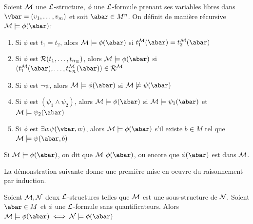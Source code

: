\begin{defi}
Soient $\mathcal{M}$ une $\mathcal{L}$-structure, $\phi$ une $\mathcal{L}$-formule prenant ses variables libres dans $ \vbar = (v_1,\dots,v_m)$
et soit $\abar \in M^n$. On définit de manière récursive $\cM \models \phi(\abar)$:
\begin{enumerate}
\item Si $\phi$ est $t_1 = t_2$, alors $\cM \models \phi(\abar)$ si $t_1^{\cM}(\abar) = t_2^{\cM}(\abar)$
\item Si $\phi$ est $\mathcal{R} (t_1,\dots,t_{n_{\mathcal{R}}})$, alors $\cM \models \phi(\abar)$ si $(t_1^{\cM}(\abar),\dots,t_{n_{\cR}}^{\cM}(\abar)) \in \cR^{\cM}$
\item Si $\phi$ est $\neg \psi$, alors $\cM \models \phi(\abar)$ si $\cM \not\models \psi(\abar)$
\item Si $\phi$ est $(\psi_1 \wedge \psi_2)$, alors $\cM \models \phi(\abar)$ si $\cM \models \psi_1(\abar)$ et $\cM \models \psi_2(\abar)$
\item Si $\phi$ est $\exists w \psi(\vbar,w)$, alors $\cM \models \phi(\abar)$ s'il existe $b \in M$ tel que $\cM \models \psi(\abar,b)$
\end{enumerate}
Si $\cM \models \phi(\abar)$, on dit que $\mathcal{M}$  $\phi(\abar)$, ou encore que $\phi(\abar)$ est  dans $\mathcal{M}$.
\end{defi}

\noindent La démonstration suivante donne une première mise en oeuvre du raisonnement par induction.

\begin{prop}
Soient $\mathcal{M}, \mathcal{N}$ deux $\mathcal{L}$-structures telles que $\mathcal{M}$ est une sous-structure de $\mathcal{N}$. Soient $\abar \in M$ et
$\phi$ une $\mathcal{L}$-formule sans quantificateurs. Alors $\cM \models \phi(\abar) \iff \cN \models \phi(\abar)$
\end{prop}

